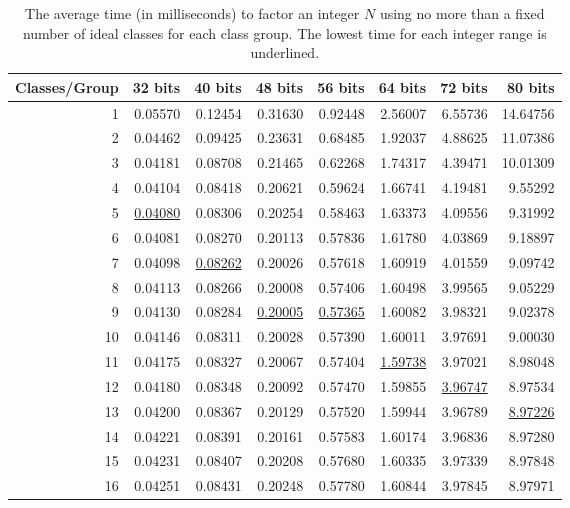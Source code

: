 \documentclass{ucalgthes1}
\theoremstyle{definition}
\begin{document}
\begin{table}[htb]
\centering
\begin{tabular}{| r | r | r | r | r | r | r | r |}
	\hline
Classes/Group & 32 bits & 40 bits & 48 bits & 56 bits & 64 bits & 72 bits & 80 bits \\
	\hline
1 & 0.05570 & 0.12454 & 0.31630 & 0.92448 & 2.56007 & 6.55736 & 14.64756 \\
2 & 0.04462 & 0.09425 & 0.23631 & 0.68485 & 1.92037 & 4.88625 & 11.07386 \\
3 & 0.04181 & 0.08708 & 0.21465 & 0.62268 & 1.74317 & 4.39471 & 10.01309 \\
4 & 0.04104 & 0.08418 & 0.20621 & 0.59624 & 1.66741 & 4.19481 & 9.55292 \\
5 & \underline{0.04080} & 0.08306 & 0.20254 & 0.58463 & 1.63373 & 4.09556 & 9.31992 \\
6 & 0.04081 & 0.08270 & 0.20113 & 0.57836 & 1.61780 & 4.03869 & 9.18897 \\
7 & 0.04098 & \underline{0.08262} & 0.20026 & 0.57618 & 1.60919 & 4.01559 & 9.09742 \\
8 & 0.04113 & 0.08266 & 0.20008 & 0.57406 & 1.60498 & 3.99565 & 9.05229 \\
9 & 0.04130 & 0.08284 & \underline{0.20005} & \underline{0.57365} & 1.60082 & 3.98321 & 9.02378 \\
10 & 0.04146 & 0.08311 & 0.20028 & 0.57390 & 1.60011 & 3.97691 & 9.00030 \\
11 & 0.04175 & 0.08327 & 0.20067 & 0.57404 & \underline{1.59738} & 3.97021 & 8.98048 \\
12 & 0.04180 & 0.08348 & 0.20092 & 0.57470 & 1.59855 & \underline{3.96747} & 8.97534 \\
13 & 0.04200 & 0.08367 & 0.20129 & 0.57520 & 1.59944 & 3.96789 & \underline{8.97226} \\
14 & 0.04221 & 0.08391 & 0.20161 & 0.57583 & 1.60174 & 3.96836 & 8.97280 \\
15 & 0.04231 & 0.08407 & 0.20208 & 0.57680 & 1.60335 & 3.97339 & 8.97848 \\
16 & 0.04251 & 0.08431 & 0.20248 & 0.57780 & 1.60844 & 3.97845 & 8.97971 \\
	\hline
\end{tabular}
\caption[Average time to factor for a fixed number of classes per group.]{The average time (in milliseconds) to factor an integer $N$ using no more than a fixed number of ideal classes for each class group.  The lowest time for each integer range is underlined.}
\label{tab:attemptedIdealClasses}
\end{table}
\end{document}
